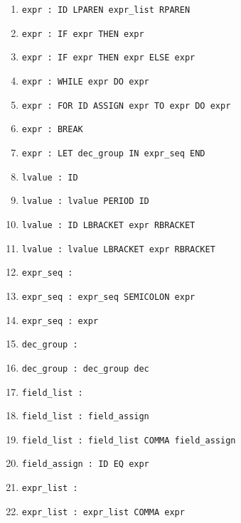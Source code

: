 \documentclass{article}
\begin{document}
\begin{enumerate}
\item \verb|expr : ID LPAREN expr_list RPAREN|

\item \verb|expr : IF expr THEN expr|

\item \verb|expr : IF expr THEN expr ELSE expr|

\item \verb|expr : WHILE expr DO expr|

\item \verb|expr : FOR ID ASSIGN expr TO expr DO expr|

\item \verb|expr : BREAK|

\item \verb|expr : LET dec_group IN expr_seq END|

\item \verb|lvalue : ID|

\item \verb|lvalue : lvalue PERIOD ID|

\item \verb|lvalue : ID LBRACKET expr RBRACKET|

\item \verb|lvalue : lvalue LBRACKET expr RBRACKET|

\item \verb|expr_seq :|

\item \verb|expr_seq : expr_seq SEMICOLON expr|

\item \verb|expr_seq : expr|

\item \verb|dec_group :|

\item \verb|dec_group : dec_group dec|

\item \verb|field_list :|

\item \verb|field_list : field_assign|

\item \verb|field_list : field_list COMMA field_assign|

\item \verb|field_assign : ID EQ expr|

\item \verb|expr_list :|

\item \verb|expr_list : expr_list COMMA expr|


\end{enumerate}
\end{document}
